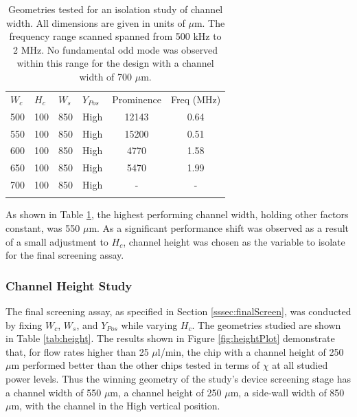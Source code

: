 \begin{table}[h]
	\caption[Geometries tested for an isolation study of channel width]{Geometries tested for an isolation study of channel width. All dimensions are given in units of $\mu$m. The frequency range scanned spanned from 500 kHz to 2 MHz. No fundamental odd mode was observed within this range for the design with a channel width of 700 $\mu$m.}
\label{tab:width}       %
\centering
\begin{tabular}{llll|cc}
\hline\noalign{\smallskip}
$W_c$ & $H_c$ & $W_s$ & $Y_{Pos}$ & Prominence & Freq (MHz)\\
\noalign{\smallskip}\hline\noalign{\smallskip}
500 & 100 & 850 & High & 12143 & 0.64\\
550 & 100 & 850 & High & 15200 & 0.51\\
600 & 100 & 850 & High & 4770 & 1.58\\
650 & 100 & 850 & High & 5470 & 1.99\\
700 & 100 & 850 & High & - & - \\
\noalign{\smallskip}\hline
\end{tabular}
\end{table}

As shown in Table \ref{tab:width}, the highest performing channel width, holding other factors constant, was 550 $\mu$m. As a significant performance shift was observed as a result of a small adjustment to $H_c$, channel height was chosen as the variable to isolate for the final screening assay.

\subsubsection{Channel Height Study}
\label{sssec:height}

The final screening assay, as specified in Section \ref{sssec:finalScreen}, was conducted by fixing $W_c$, $W_s$, and $Y_{Pos}$ while varying $H_c$. The geometries studied are shown in Table \ref{tab:height}. The results shown in Figure \ref{fig:heightPlot} demonstrate that, for flow rates higher than 25 $\mu$l/min, the chip with a channel height of 250 $\mu$m performed better than the other chips tested in terms of $\chi$ at all studied power levels. Thus the winning geometry of the study's device screening stage has a channel width of 550 $\mu$m, a channel height of 250 $\mu$m, a side-wall width of 850 $\mu$m, with the channel in the High vertical position.

